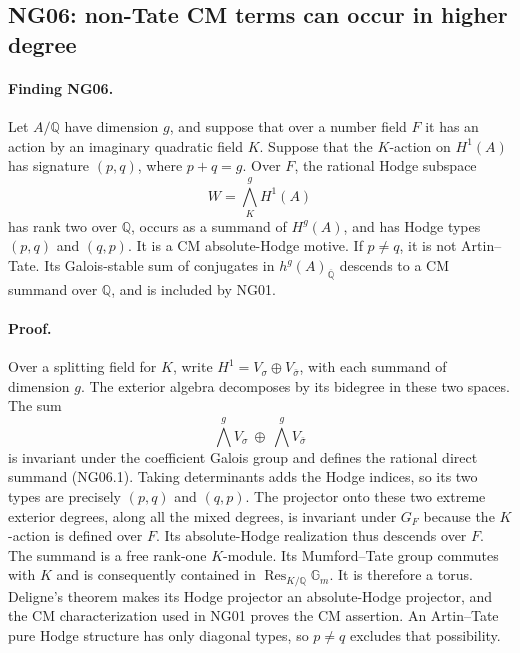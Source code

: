 \documentclass[11pt]{article}
\theoremstyle{remark}
\begin{document}
\subsection{NG06: non-Tate CM terms can occur in higher degree}
\label{NG06}

\paragraph{Finding NG06.}
Let $A/\mathbb Q$ have dimension $g$, and suppose that over a number
field $F$ it has an action by an imaginary quadratic field $K$.
Suppose that the $K$-action on $H^1(A)$ has signature $(p,q)$, where
$p+q=g$.  Over $F$, the rational Hodge subspace
\[
                         W=\bigwedge_K^g H^1(A)               \tag{NG06.1}
\]
has rank two over $\mathbb Q$, occurs as a summand of $H^g(A)$,
and has Hodge types $(p,q)$ and $(q,p)$.  It is a CM absolute-Hodge
motive.  If $p\ne q$, it is not Artin--Tate.  Its Galois-stable sum of
conjugates in $h^g(A)_{\overline{\mathbb Q}}$ descends to a CM summand
over $\mathbb Q$, and is included by NG01.

\paragraph{Proof.}
Over a splitting field for $K$, write
$H^1=V_\sigma\oplus V_{\bar\sigma}$, with each summand of dimension
$g$.  The exterior algebra decomposes by its bidegree in these two
spaces.  The sum
\[
                      \bigwedge^g V_\sigma\ \oplus\
                      \bigwedge^g V_{\bar\sigma}
\]
is invariant under the coefficient Galois group and defines the
rational direct summand (NG06.1).  Taking determinants adds the Hodge
indices, so its two types are precisely $(p,q)$ and $(q,p)$.
The projector onto these two extreme exterior degrees, along all
the mixed degrees, is invariant under $G_F$ because the $K$-action
is defined over $F$.  Its absolute-Hodge realization thus descends
over $F$.
The summand is a free rank-one $K$-module.  Its Mumford--Tate group
commutes with $K$ and is consequently contained in
$\operatorname{Res}_{K/\mathbb Q}\mathbb G_m$.  It is therefore a
torus.  Deligne's theorem makes its Hodge projector an absolute-Hodge
projector, and the CM characterization used in NG01 proves the CM
assertion.  An Artin--Tate pure Hodge structure has only diagonal
types, so $p\ne q$ excludes that possibility.
\end{document}
